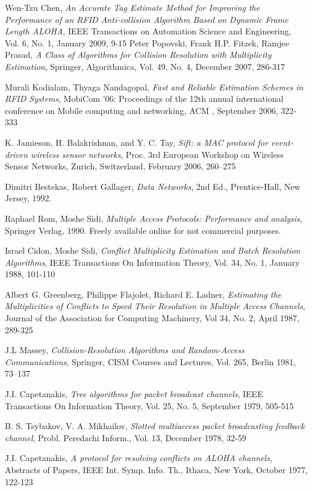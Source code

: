 \begin{thebibliography}{99}
 Wen-Tzu Chen, \emph{An Accurate Tag Estimate Method for Improving the Performance of an RFID Anti-collision Algorithm Based on Dynamic Frame Length ALOHA}, IEEE Transactions on Automation Science and Engineering, Vol. 6, No. 1, January 2009, 9-15
  Peter Popovski, Frank H.P. Fitzek, Ramjee Prasad, \emph{ A Class of Algorithms for Collision Resolution with Multiplicity Estimation}, Springer, Algorithmica, Vol. 49, No. 4, December 2007, 286-317
  
Murali Kodialam, Thyaga Nandagopal, \emph{Fast and Reliable Estimation Schemes in RFID Systems}, MobiCom '06: Proceedings of the 12th annual international conference on Mobile computing and networking, ACM , September 2006, 322-333 
 
K. Jamieson, H. Balakrishnan, and Y. C. Tay, \emph{Sift: a MAC protocol for event-driven wireless sensor networks},  Proc. 3rd European Workshop on Wireless Sensor Networks, Zurich, Switzerland, February 2006, 260–275 

Dimitri Bestekas, Robert Gallager, \emph{Data Networks}, 2nd Ed., Prentice-Hall, New Jersey, 1992. 

 Raphael Rom, Moshe Sidi, \emph{Multiple Access Protocols: Performance and analysis}, Springer Verlag, 1990. Freely available online for not commercial purposes.

 Israel Cidon, Moshe Sidi, \emph{Conflict Multiplicity Estimation and Batch Resolution Algorithms}, IEEE Transactions On Information Theory, Vol. 34, No. 1, January 1988, 101-110

  Albert G. Greenberg, Philippe Flajolet,  Richard E. Ladner,
  \emph{Estimating the Multiplicities of Conflicts to Speed Their Resolution in Multiple Access Channels},
  Journal of the Association for Computing Machinery,
  Vol 34, No. 2, April 1987, 289-325
 
  J.L Massey, \emph{Collision-Resolution Algorithms and Random-Access Communications}, Springer, CISM Courses and Lectures, Vol. 265, Berlin 1981, 73–137
  
  J.I. Capetanakis, \emph{ Tree algorithms for packet broadcast channels}, IEEE Transactions On Information Theory, Vol. 25, No. 5, September 1979, 505-515
 
B. S. Tsybakov, V. A. Mikhailov, \emph{Slotted multiaccess packet broadcasting feedback channel}, Probl. Peredachi Inform., Vol. 13, December 1978, 32-59
 
J.I. Capetanakis, \emph{A protocol for resolving conflicts on ALOHA channels}, Abstracts of Papers, IEEE Int. Symp. Info. Th., Ithaca, New York, October 1977, 122-123

 \end{thebibliography}
 
